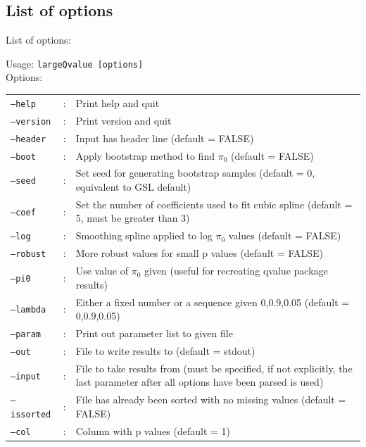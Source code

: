 \documentclass{amsart}
\begin{document}
\begin{framed}
  \subsection{List of options}

  \noindent List of options:

  \noindent Usage: \texttt{largeQvalue [options]}\\
  \noindent Options:


 \begin{tabular}{llp{9cm}}
    \texttt{--help}    & : &Print help and quit \\
    \texttt{--version} & : &Print version and quit \\
    \texttt{--header}  & : &Input has header line (default = FALSE) \\
    \texttt{--boot}    & : &Apply bootstrap method to find $\pi_0$ (default = FALSE) \\
    \texttt{--seed}    & : &Set seed for generating bootstrap samples (default = 0, equivalent to GSL default) \\
    \texttt{--coef}    & : &Set the number of coefficients used to fit cubic spline (default = 5, must be greater than 3) \\
    \texttt{--log}     & : &Smoothing spline applied to log $\pi_0$ values (default = FALSE) \\
    \texttt{--robust}  & : &More robust values for small p values (default = FALSE) \\
    \texttt{--pi0}     & : &Use value of $\pi_0$ given (useful for recreating qvalue package results) \\
    \texttt{--lambda}  & : &Either a fixed number or a sequence given 0,0.9,0.05 (default = 0,0.9,0.05) \\
    \texttt{--param}   & : &Print out parameter list to given file \\
    \texttt{--out}     & : &File to write results to (default = stdout) \\
    \texttt{--input}   & : &File to take results from (must be specified, if not explicitly, the last parameter after all options have been parsed is used) \\
    \texttt{--issorted}& : &File has already been sorted with no missing values (default = FALSE) \\
    \texttt{--col}     & : &Column with p values (default = 1) \\
\end{tabular}
 \end{framed}
\end{document}
